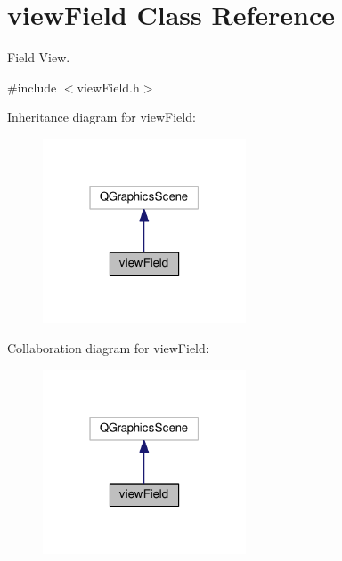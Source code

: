 \hypertarget{classviewField}{\section{view\+Field Class Reference}
\label{classviewField}
}


Field View.  




{\ttfamily \#include $<$view\+Field.\+h$>$}



Inheritance diagram for view\+Field\+:
\nopagebreak
\begin{figure}[H]
\begin{center}
\leavevmode
\includegraphics[width=171pt]{classviewField__inherit__graph}
\end{center}
\end{figure}


Collaboration diagram for view\+Field\+:
\nopagebreak
\begin{figure}[H]
\begin{center}
\leavevmode
\includegraphics[width=171pt]{classviewField__coll__graph}
\end{center}
\end{figure}
